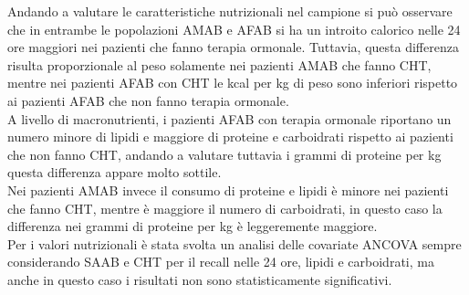 \documentclass[12pt]{article}
\begin{document}
Andando a valutare le caratteristiche nutrizionali nel campione si può osservare che in entrambe le popolazioni AMAB e AFAB si ha un introito calorico nelle 24 ore maggiori nei pazienti che fanno terapia ormonale. Tuttavia, questa differenza risulta proporzionale al peso solamente nei pazienti AMAB che fanno CHT, mentre nei pazienti AFAB con CHT le kcal per kg di peso sono inferiori rispetto ai pazienti AFAB che non fanno terapia ormonale.\\
A livello di macronutrienti, i pazienti AFAB con terapia ormonale riportano un numero minore di lipidi e maggiore di proteine e carboidrati rispetto ai pazienti che non fanno CHT, andando a valutare tuttavia i grammi di proteine per kg questa differenza appare molto sottile.\\
Nei pazienti AMAB invece il consumo di proteine e lipidi è minore nei pazienti che fanno CHT, mentre è maggiore il numero di carboidrati, in questo caso la differenza nei grammi di proteine per kg è leggeremente maggiore. \\
Per i valori nutrizionali è stata svolta un analisi delle covariate ANCOVA sempre considerando SAAB e CHT per il recall nelle 24 ore, lipidi e carboidrati, ma anche in questo caso i risultati non sono statisticamente significativi.
\end{document}
